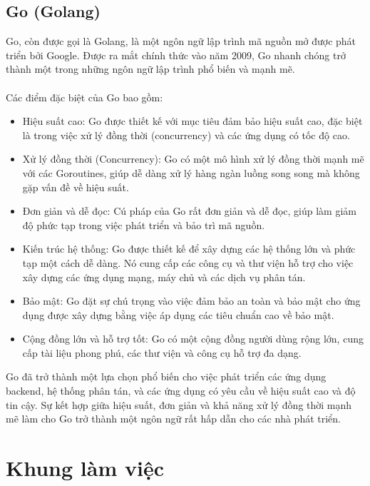 \subsection{Go (Golang)}
Go, còn được gọi là Golang, là một ngôn ngữ lập trình mã nguồn mở được phát triển bởi Google. Được ra mắt chính thức vào năm 2009, Go nhanh chóng trở thành một trong những ngôn ngữ lập trình phổ biến và mạnh mẽ.\\
\\
Các điểm đặc biệt của Go bao gồm:
\begin{itemize}
    \item Hiệu suất cao: Go được thiết kế với mục tiêu đảm bảo hiệu suất cao, đặc biệt là trong việc xử lý đồng thời (concurrency) và các ứng dụng có tốc độ cao.
    \item Xử lý đồng thời (Concurrency): Go có một mô hình xử lý đồng thời mạnh mẽ với các Goroutines, giúp dễ dàng xử lý hàng ngàn luồng song song mà không gặp vấn đề về hiệu suất.
    \item Đơn giản và dễ đọc: Cú pháp của Go rất đơn giản và dễ đọc, giúp làm giảm độ phức tạp trong việc phát triển và bảo trì mã nguồn.
    \item Kiến trúc hệ thống: Go được thiết kế để xây dựng các hệ thống lớn và phức tạp một cách dễ dàng. Nó cung cấp các công cụ và thư viện hỗ trợ cho việc xây dựng các ứng dụng mạng, máy chủ và các dịch vụ phân tán.
    \item Bảo mật: Go đặt sự chú trọng vào việc đảm bảo an toàn và bảo mật cho ứng dụng được xây dựng bằng việc áp dụng các tiêu chuẩn cao về bảo mật.
    \item Cộng đồng lớn và hỗ trợ tốt: Go có một cộng đồng người dùng rộng lớn, cung cấp tài liệu phong phú, các thư viện và công cụ hỗ trợ đa dạng.
\end{itemize}
Go đã trở thành một lựa chọn phổ biến cho việc phát triển các ứng dụng backend, hệ thống phân tán, và các ứng dụng có yêu cầu về hiệu suất cao và độ tin cậy. Sự kết hợp giữa hiệu suất, đơn giản và khả năng xử lý đồng thời mạnh mẽ làm cho Go trở thành một ngôn ngữ rất hấp dẫn cho các nhà phát triển.

\section{Khung làm việc}
